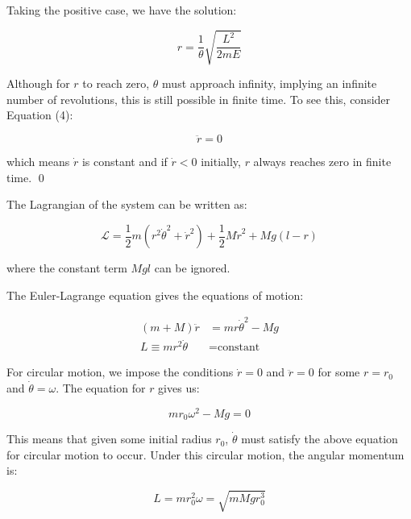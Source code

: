 \documentclass[12pt]{article}
\begin{document}
Taking the positive case, we have the solution:

\begin{equation}
    r = \frac{1}{\theta} \sqrt{\frac{L^{2}}{2mE}}
\end{equation}

Although for $r$ to reach zero, $\theta$ must approach infinity, implying an infinite number of revolutions, this is still possible in finite time. To see this, consider Equation (4):

\begin{equation}
    \ddot{r} = 0
\end{equation}

which means $\dot{r}$ is constant and if $\dot{r} <0$ initially, $r$ always reaches zero in finite time.
\qed



The Lagrangian of the system can be written as:

\begin{equation}
    \mathcal{L} = \frac{1}{2} m \left( r^{2} \dot{\theta}^{2} + \dot{r}^{2} \right) + \frac{1}{2} M \dot{r}^{2} + Mg(l-r)
\end{equation}

where the constant term $Mgl$ can be ignored.

The Euler-Lagrange equation gives the equations of motion:

\begin{equation}
\begin{split}
    (m + M) \ddot{r} &= mr\dot{\theta}^{2} - Mg \\
    L \equiv mr^{2}\dot{\theta} &= \text{constant}
\end{split}
\end{equation}

For circular motion, we impose the conditions $\dot{r} = 0$ and $\ddot{r} = 0$ for some $r = r_{0}$ and $\dot{\theta} = \omega$. The equation for $r$ gives us:

\begin{equation}
    mr_{0}\omega^{2} - Mg = 0
\end{equation}

This means that given some initial radius $r_{0}$, $\dot{\theta}$ must satisfy the above equation for circular motion to occur. Under this circular motion, the angular momentum is:

\begin{equation}
    L = mr_{0}^{2}\omega = \sqrt{mMg r_{0}^{3}}
\end{equation}
\end{document}
